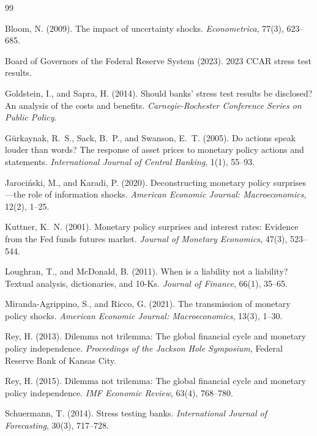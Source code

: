 \documentclass[11pt]{article}
\begin{document}
\begin{thebibliography}{99}

Bloom, N. (2009). The impact of uncertainty shocks. \textit{Econometrica}, 77(3), 623--685.

Board of Governors of the Federal Reserve System (2023). 2023 CCAR stress test results.

Goldstein, I., and Sapra, H. (2014). Should banks' stress test results be disclosed? An analysis of the costs and benefits. \textit{Carnegie-Rochester Conference Series on Public Policy}.

G\"urkaynak, R.~S., Sack, B.~P., and Swanson, E.~T. (2005). Do actions speak louder than words? The response of asset prices to monetary policy actions and statements. \textit{International Journal of Central Banking}, 1(1), 55--93.

Jaroci\'nski, M., and Karadi, P. (2020). Deconstructing monetary policy surprises---the role of information shocks. \textit{American Economic Journal: Macroeconomics}, 12(2), 1--25.

Kuttner, K.~N. (2001). Monetary policy surprises and interest rates: Evidence from the Fed funds futures market. \textit{Journal of Monetary Economics}, 47(3), 523--544.

Loughran, T., and McDonald, B. (2011). When is a liability not a liability? Textual analysis, dictionaries, and 10-Ks. \textit{Journal of Finance}, 66(1), 35--65.

Miranda-Agrippino, S., and Ricco, G. (2021). The transmission of monetary policy shocks. \textit{American Economic Journal: Macroeconomics}, 13(3), 1--30.

Rey, H. (2013). Dilemma not trilemma: The global financial cycle and monetary policy independence. \textit{Proceedings of the Jackson Hole Symposium}, Federal Reserve Bank of Kansas City.

Rey, H. (2015). Dilemma not trilemma: The global financial cycle and monetary policy independence. \textit{IMF Economic Review}, 63(4), 768--780.

Schuermann, T. (2014). Stress testing banks. \textit{International Journal of Forecasting}, 30(3), 717--728.

\end{thebibliography}
\end{document}
